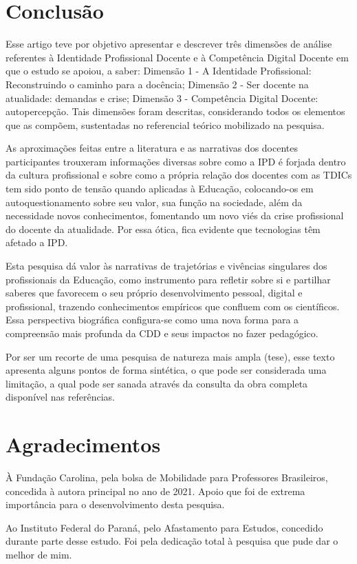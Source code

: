 \documentclass[portuguese]{textolivre}
\begin{document}
\section{Conclusão}\label{sec-titulo}
Esse artigo teve por objetivo apresentar e descrever três dimensões de análise referentes à Identidade Profissional Docente e à Competência Digital Docente em que o estudo se apoiou, a saber: Dimensão 1 - A Identidade Profissional: Reconstruindo o caminho para a docência; Dimensão 2 - Ser docente na atualidade: demandas e crise; Dimensão 3 - Competência Digital Docente: autopercepção. Tais dimensões foram descritas, considerando todos os elementos que as compõem, sustentadas no referencial teórico mobilizado na pesquisa.

As aproximações feitas entre a literatura e as narrativas dos docentes participantes trouxeram informações diversas sobre como a IPD é forjada dentro da cultura profissional e sobre como a própria relação dos docentes com as TDICs tem sido ponto de tensão quando aplicadas à Educação, colocando-os em autoquestionamento sobre seu valor, sua função na sociedade, além da necessidade novos conhecimentos, fomentando um novo viés da crise profissional do docente da atualidade. Por essa ótica, fica evidente que tecnologias têm afetado a IPD.

Esta pesquisa dá valor às narrativas de trajetórias e vivências singulares dos profissionais da Educação, como instrumento para refletir sobre si e partilhar saberes que favorecem o seu próprio desenvolvimento pessoal, digital e profissional, trazendo conhecimentos empíricos que confluem com os científicos. Essa perspectiva biográfica configura-se como uma nova forma para a compreensão mais profunda da CDD e seus impactos no fazer pedagógico.

Por ser um recorte de uma pesquisa de natureza mais ampla (tese), esse texto apresenta alguns pontos de forma sintética, o que pode ser considerada uma limitação, a qual pode ser sanada através da consulta da obra completa disponível nas referências.

\section{Agradecimentos}\label{sec-idioma}
À Fundação Carolina, pela bolsa de Mobilidade para Professores Brasileiros, concedida à autora principal no ano de 2021. Apoio que foi de extrema importância para o desenvolvimento desta pesquisa.

Ao Instituto Federal do Paraná, pelo Afastamento para Estudos, concedido durante parte desse estudo. Foi pela dedicação total à pesquisa que pude dar o melhor de mim.
\end{document}
